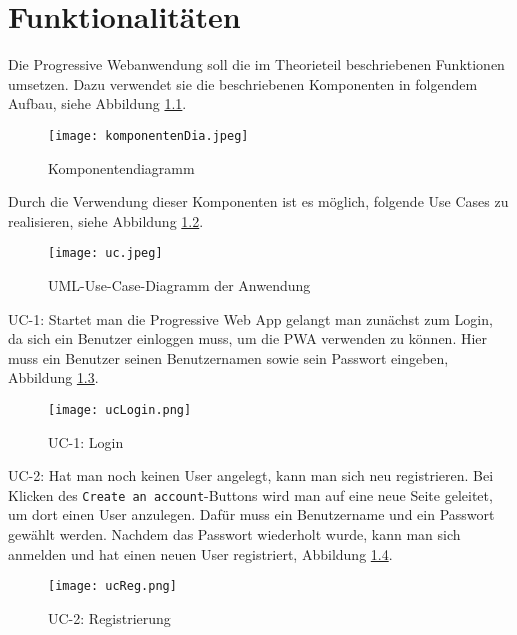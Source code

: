\chapter{Funktionalitäten}

Die Progressive Webanwendung soll die im Theorieteil beschriebenen Funktionen umsetzen. Dazu verwendet sie die beschriebenen Komponenten in folgendem Aufbau, siehe Abbildung \ref{img:kompoDia}.

\begin{figure}[!htb]
    \centering
    \texttt{[image: komponentenDia.jpeg]}
    \caption{Komponentendiagramm}
    \label{img:kompoDia}
\end{figure}

Durch die Verwendung dieser Komponenten ist es möglich, folgende Use Cases zu realisieren, siehe Abbildung \ref{img:uc}.

\begin{figure}[!htb]
    \centering
    \texttt{[image: uc.jpeg]}
    \caption{UML-Use-Case-Diagramm der Anwendung}
    \label{img:uc}
\end{figure}

\clearpage

UC-1:
Startet man die Progressive Web App gelangt man zunächst zum Login, da sich ein Benutzer einloggen muss, um die PWA verwenden zu können. Hier muss ein Benutzer seinen Benutzernamen sowie sein Passwort eingeben, Abbildung \ref{uc1}.

\begin{figure}[!htb]
    \centering
    \texttt{[image: ucLogin.png]}
    \caption{UC-1: Login}
    \label{uc1}
\end{figure}

\clearpage

UC-2: 
Hat man noch keinen User angelegt, kann man sich neu registrieren. Bei Klicken des \texttt{Create an account}-Buttons wird man auf eine neue Seite geleitet, um dort einen User anzulegen. Dafür muss ein Benutzername und ein Passwort gewählt werden. Nachdem das Passwort wiederholt wurde, kann man sich anmelden und hat einen neuen User registriert, Abbildung \ref{uc2}. 

\begin{figure}[!htb]
    \centering
    \texttt{[image: ucReg.png]}
    \caption{UC-2: Registrierung}
    \label{uc2}
\end{figure}

\clearpage


